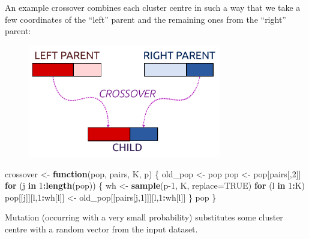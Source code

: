 \documentclass[10pt,b5paper,krantz1]{krantz}
\newenvironment{Shaded}{\begin{snugshade}}{\end{snugshade}}
\newcommand{\ControlFlowTok}[1]{\textcolor[rgb]{0.27,0.27,0.27}{\textbf{#1}}}
\newcommand{\DataTypeTok}[1]{\textcolor[rgb]{0.27,0.27,0.27}{#1}}
\newcommand{\DecValTok}[1]{\textcolor[rgb]{0.06,0.06,0.06}{#1}}
\newcommand{\KeywordTok}[1]{\textcolor[rgb]{0.27,0.27,0.27}{\textbf{#1}}}
\newcommand{\NormalTok}[1]{#1}
\newcommand{\OperatorTok}[1]{\textcolor[rgb]{0.43,0.43,0.43}{\textbf{#1}}}
\newcommand{\OtherTok}[1]{\textcolor[rgb]{0.37,0.37,0.37}{#1}}
\newcommand{\StringTok}[1]{\textcolor[rgb]{0.5,0.5,0.5}{#1}}
\begin{document}
An example crossover combines each cluster centre
in such a way that we take a few coordinates of the ``left'' parent
and the remaining ones from the ``right'' parent:

\begin{figure}
\hypertarget{fig:crossover}{%
\centering
\includegraphics[width=0.75\textwidth,height=\textheight]{figures/crossover.pdf}
\caption{}\label{fig:crossover}
}
\end{figure}

\begin{Shaded}
\begin{Highlighting}[]
\NormalTok{crossover <-}\StringTok{ }\ControlFlowTok{function}\NormalTok{(pop, pairs, K, p) \{}
\NormalTok{    old_pop <-}\StringTok{ }\NormalTok{pop}
\NormalTok{    pop <-}\StringTok{ }\NormalTok{pop[pairs[,}\DecValTok{2}\NormalTok{]]}
    \ControlFlowTok{for}\NormalTok{ (j }\ControlFlowTok{in} \DecValTok{1}\OperatorTok{:}\KeywordTok{length}\NormalTok{(pop)) \{}
\NormalTok{        wh <-}\StringTok{ }\KeywordTok{sample}\NormalTok{(p}\DecValTok{-1}\NormalTok{, K, }\DataTypeTok{replace=}\OtherTok{TRUE}\NormalTok{)}
        \ControlFlowTok{for}\NormalTok{ (l }\ControlFlowTok{in} \DecValTok{1}\OperatorTok{:}\NormalTok{K)}
\NormalTok{            pop[[j]][l,}\DecValTok{1}\OperatorTok{:}\NormalTok{wh[l]] <-}
\StringTok{                }\NormalTok{old_pop[[pairs[j,}\DecValTok{1}\NormalTok{]]][l,}\DecValTok{1}\OperatorTok{:}\NormalTok{wh[l]]}
\NormalTok{    \}}
\NormalTok{    pop}
\NormalTok{\}}
\end{Highlighting}
\end{Shaded}

Mutation (occurring with a very small probability)
substitutes some cluster centre with a random vector from the input dataset.
\end{document}
